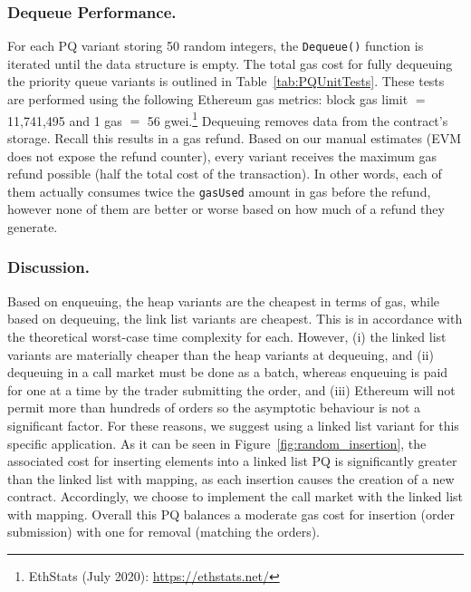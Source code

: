 




\subsubsection{Dequeue Performance.} For each PQ variant storing 50 random integers, the \texttt{Dequeue()} function is iterated until the data structure is empty. The total gas cost for fully dequeuing the priority queue variants is outlined in Table~\ref{tab:PQUnitTests}. These tests are performed using the following Ethereum gas metrics: block gas limit $=$11,741,495 and 1 gas $=$ 56 gwei.\footnote{EthStats (July 2020): \url{https://ethstats.net/}} Dequeuing removes data from the contract's storage. Recall this results in a gas refund. Based on our manual estimates (EVM does not expose the refund counter), every variant receives the maximum gas refund possible (\ie half the total cost of the transaction). In other words, each of them actually consumes twice the \texttt{gasUsed} amount in gas before the refund, however none of them are better or worse based on how much of a refund they generate.  

\subsubsection{Discussion.} Based on enqueuing, the heap variants are the cheapest in terms of gas, while based on dequeuing, the link list variants are cheapest. This is in accordance with the theoretical worst-case time complexity for each. However, (i) the linked list variants are materially cheaper than the heap variants at dequeuing, and (ii) dequeuing in a call market must be done as a batch, whereas enqueuing is paid for one at a time by the trader submitting the order, and (iii) Ethereum will not permit more than hundreds of orders so the asymptotic behaviour is not a significant factor. For these reasons, we suggest using a linked list variant for this specific application. As it can be seen in Figure~\ref{fig:random_insertion}, the associated cost for inserting elements into a linked list PQ is significantly greater than the linked list with mapping, as each insertion causes the creation of a new contract. Accordingly, we choose to implement the call market with the linked list with mapping. Overall this PQ balances a moderate gas cost for insertion (\ie order submission) with one for removal (\ie matching the orders). 

